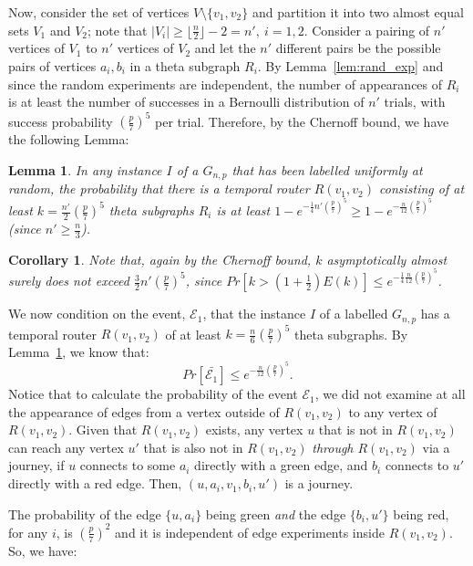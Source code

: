 \documentclass[a4paper,UKenglish]{article}
\newtheorem{lemma}{Lemma}
\newtheorem{corollary}{Corollary}
\begin{document}
Now, consider the set of vertices $V \setminus \{v_1,v_2\}$ and partition it into two almost equal sets $V_1$ and $V_2$; note that $|V_i| \geq \lfloor \frac{n}{2} \rfloor -2 = n',~i=1,2$. Consider a pairing of $n'$ vertices of $V_1$ to $n'$ vertices of $V_2$ and let the $n'$ different pairs be the possible pairs of vertices $a_i,b_i$ in a theta subgraph $R_i$. By Lemma~\ref{lem:rand_exp} and since the random experiments are independent, the number of appearances of $R_i$ is at least the number of successes in a Bernoulli distribution of $n'$ trials, with success probability $\left( \frac{p}{7} \right)^5$ per trial. Therefore, by the Chernoff bound, we have the following Lemma:
\begin{lemma}\label{lem:prob_theta_sub}
In any instance $I$ of a $G_{n,p}$ that has been labelled uniformly at random, the probability that there is a temporal router $R(v_1,v_2)$ consisting of at least $k= \frac{n'}{2} \left( \frac{p}{7} \right)^5 $ theta subgraphs $R_i$ is at least $1- e^{-\frac{1}{4} n' \left( \frac{p}{7} \right)^5} \geq 1- e^{-\frac{n}{12} \left( \frac{p}{7} \right)^5} $ (since $n' \geq \frac{n}{3}$).
\end{lemma}

\begin{corollary}
Note that, again by the Chernoff bound, $k$ asymptotically almost surely \emph{does not exceed} $\frac{3}{2}n' \left( \frac{p}{7} \right)^5 $, since $Pr[k> \left(1+\frac{1}{2} \right) E(k)] \leq e^{-\frac{1}{4} \frac{n}{12} \left( \frac{p}{7} \right)^5}$.
\end{corollary}

We now condition on the event, $\mathcal{E}_1$, that the instance $I$ of a labelled $G_{n,p}$ has a temporal router $R(v_1,v_2)$ of at least $k=\frac{n}{6} \left( \frac{p}{7} \right)^5$ theta subgraphs. By Lemma~\ref{lem:prob_theta_sub}, we know that:
\[Pr[ 	\bar{\mathcal{E}_1}] \leq e^{-\frac{n}{12} \left( \frac{p}{7} \right)^5}.\]
Notice that to calculate the probability of the event $\mathcal{E}_1$, we did not examine at all the appearance of edges from a vertex outside of $R(v_1,v_2)$ to any vertex of $R(v_1,v_2)$. Given that $R(v_1,v_2)$ exists, any vertex $u$ that is not in $R(v_1,v_2)$ can reach any vertex $u'$ that is also not in $R(v_1,v_2)$ \emph{through $R(v_1,v_2)$} via a journey, if $u$ connects to some $a_i$ directly with a green edge, and  $b_i$ connects to $u'$ directly with a red edge. Then, $(u,a_i,v_1,b_i,u')$ is a journey.

The probability of the edge $\{u,a_i\}$ being green \emph{and} the edge $\{b_i,u'\}$ being red, for any $i$, is $\left( \frac{p}{7} \right)^2$ and it is independent of edge experiments inside $R(v_1,v_2)$. So, we have:
\end{document}
